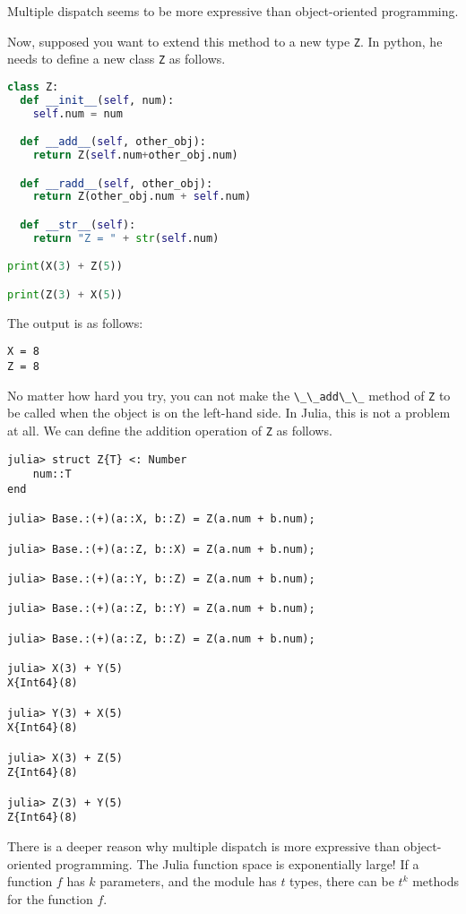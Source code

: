 \documentclass[
  notoc %
]{tufte-book}
\newcommand{\passthrough}[1]{#1}
\begin{document}
Multiple dispatch seems to be more expressive than object-oriented
programming.

Now, supposed you want to extend this method to a new type
\passthrough{\lstinline!Z!}. In python, he needs to define a new class
\passthrough{\lstinline!Z!} as follows.

\begin{lstlisting}[language=Python]
class Z:
  def __init__(self, num):
    self.num = num

  def __add__(self, other_obj):
    return Z(self.num+other_obj.num)

  def __radd__(self, other_obj):
    return Z(other_obj.num + self.num)

  def __str__(self):
    return "Z = " + str(self.num)

print(X(3) + Z(5))

print(Z(3) + X(5))
\end{lstlisting}

The output is as follows:

\begin{lstlisting}
X = 8
Z = 8
\end{lstlisting}

No matter how hard you try, you can not make the
\passthrough{\lstinline!\_\_add\_\_!} method of
\passthrough{\lstinline!Z!} to be called when the object is on the
left-hand side. In Julia, this is not a problem at all. We can define
the addition operation of \passthrough{\lstinline!Z!} as follows.

\begin{lstlisting}
julia> struct Z{T} <: Number
    num::T
end

julia> Base.:(+)(a::X, b::Z) = Z(a.num + b.num);

julia> Base.:(+)(a::Z, b::X) = Z(a.num + b.num);

julia> Base.:(+)(a::Y, b::Z) = Z(a.num + b.num);

julia> Base.:(+)(a::Z, b::Y) = Z(a.num + b.num);

julia> Base.:(+)(a::Z, b::Z) = Z(a.num + b.num);

julia> X(3) + Y(5)
X{Int64}(8)

julia> Y(3) + X(5)
X{Int64}(8)

julia> X(3) + Z(5)
Z{Int64}(8)

julia> Z(3) + Y(5)
Z{Int64}(8)
\end{lstlisting}

There is a deeper reason why multiple dispatch is more expressive than
object-oriented programming. The Julia function space is exponentially
large! If a function \(f\) has \(k\) parameters, and the module has
\(t\) types, there can be \(t^k\) methods for the function \(f\).
\end{document}
